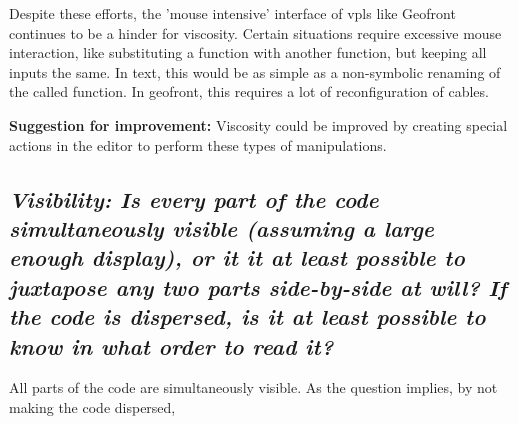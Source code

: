 Despite these efforts, the 'mouse intensive' interface of vpls like Geofront continues to be a hinder for viscosity.
Certain situations require excessive mouse interaction, like substituting a function with another function, but keeping all inputs the same.
In text, this would be as simple as a non-symbolic renaming of the called function.
In geofront, this requires a lot of reconfiguration of cables. 

\textbf{Suggestion for improvement:} Viscosity could be improved by creating special actions in the editor to perform these types of manipulations.  


\subsection*{\emph{Visibility: Is every part of the code simultaneously visible (assuming a large enough display), or it it at least possible to juxtapose any two parts side-by-side at will? If the code is dispersed, is it at least possible to know in what order to read it?}}

All parts of the code are simultaneously visible. 
As the question implies, by not making the code dispersed, 












